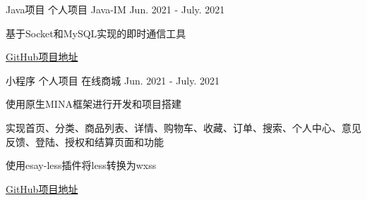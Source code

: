 \begin{cventries}
  \cventry
    {Java项目} %
    {个人项目} %
    {Java-IM} %
    {Jun. 2021 - July. 2021} %
    {
      \begin{cvitems} %
        \item {基于Socket和MySQL实现的即时通信工具}
        \item {\href{https://github.com/zhoudexi/Java-IM}{GitHub项目地址}}
      \end{cvitems}
    }

  \cventry
    {小程序} %
    {个人项目} %
    {在线商城} %
    {Jun. 2021 - July. 2021} %
    {
      \begin{cvitems} %
        \item {使用原生MINA框架进行开发和项目搭建}
        \item {实现首页、分类、商品列表、详情、购物车、收藏、订单、搜索、个人中心、意见反馈、登陆、授权和结算页面和功能}
        \item {使用esay-less插件将less转换为wxss}
        \item {\href{https://github.com/zhoudexi/Mini-Programs-Store}{GitHub项目地址}}
      \end{cvitems}
    }

\end{cventries}
